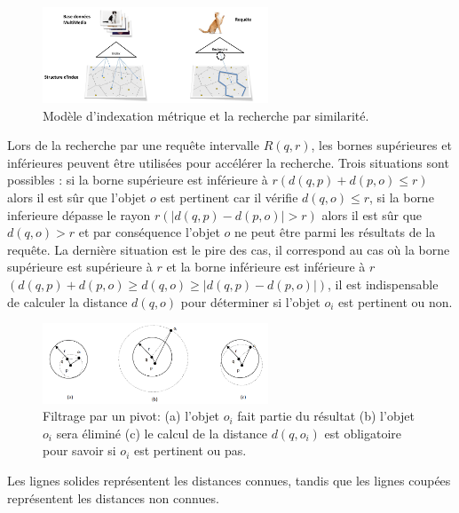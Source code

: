 \begin{figure}[H]
	\centering
	\includegraphics[width=0.6\textwidth]{Figures/similarity.png} %
	\caption{Modèle d'indexation métrique et la recherche par similarité.}
\end{figure}

Lors de la recherche par une requête intervalle $ R(q,r) $, les bornes supérieures et inférieures peuvent être utilisées pour accélérer la recherche. Trois situations sont possibles : si la borne supérieure est inférieure à $  r (d(q,p)+d(p,o) \leq r ) $ alors il est sûr que l’objet $ o $ est pertinent car il vérifie $ d(q,o) \leq r $, si la borne inferieure dépasse le rayon $ r ( |d(q,p)-d(p,o)| > r )  $ alors il est sûr que $ d(q,o) > r $ et par conséquence l’objet $ o $ ne peut être parmi les résultats de la requête. La dernière situation est le pire des cas, il correspond au cas où la borne supérieure est supérieure à $ r $ et la borne inférieure est inférieure à  $ r $  $  (d(q,p)+d(p,o) \geq d(q,o)\geq |d(q,p)-d(p,o)|) $, il est indispensable de calculer la distance $ d(q,o) $ pour déterminer si l’objet $ o_i $ est pertinent ou non.

\begin{figure}[H]
	\centering
	\includegraphics[width=0.6\textwidth]{Figures/pivot.png} %
	\caption{Filtrage par un pivot: (a) l'objet $  o_i $ fait partie du résultat (b) l'objet $ o_i $ sera éliminé (c) le calcul de la
		distance $ d(q,o_i) $ est obligatoire pour savoir si $ o_i $ est pertinent ou pas.}
\end{figure}

Les lignes solides représentent les distances connues, tandis que les lignes coupées représentent les distances non connues.\\

